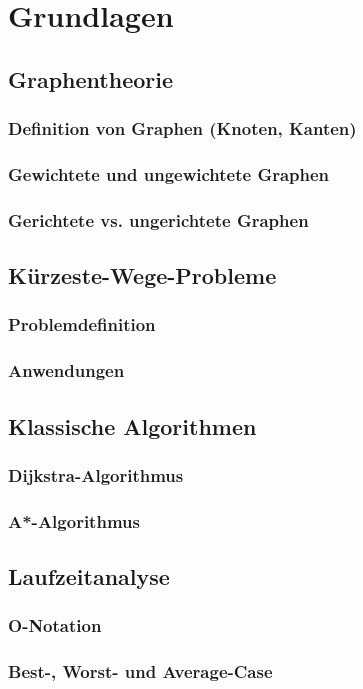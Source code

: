 \chapter{Grundlagen} %
\label{chap:grundlagen}

\section{Graphentheorie}

\subsection{Definition von Graphen (Knoten, Kanten)}

\subsection{Gewichtete und ungewichtete Graphen}

\subsection{Gerichtete vs. ungerichtete Graphen}

\section{Kürzeste-Wege-Probleme}

\subsection{Problemdefinition}

\subsection{Anwendungen}

\section{Klassische Algorithmen}

\subsection{Dijkstra-Algorithmus}

\subsection{A*-Algorithmus}

\section{Laufzeitanalyse}

\subsection{O-Notation}

\subsection{Best-, Worst- und Average-Case}